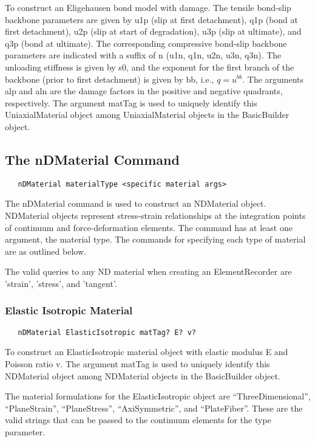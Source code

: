 \documentclass[12pt]{article}
\begin{document}
To construct an Eligehausen bond model with damage. The tensile bond-slip backbone
parameters are given by u1p (slip at first detachment), q1p (bond at first
detachment), u2p (slip at start of degradation), u3p (slip at ultimate), and
q3p (bond at ultimate). The corresponding compressive bond-slip backbone parameters are
indicated with a suffix of n (u1n, q1n, u2n, u3n, q3n).  The unloading stiffness
is given by s0, and the exponent for the first branch of the backbone (prior
to first detachment) is given by bb, i.e., $q = u^{bb}$. The arguments
alp and aln are the damage factors in the positive and negative quadrants,
respectively. The argument 
matTag is used to uniquely identify this UniaxialMaterial object among 
UniaxialMaterial objects in the BasicBuilder object.


\subsection{The nDMaterial Command}
{\sf\small
\begin{verbatim}
   nDMaterial materialType <specific material args>
\end{verbatim}
}

The nDMaterial command is used to construct an NDMaterial object. NDMaterial
objects represent stress-strain relationships at the integration points of
continuum and force-deformation elements. The command has at least one
argument, the material type. The commands for specifying
each type of material are as outlined below.  

The valid queries to any ND material when creating an ElementRecorder
are 'strain', 'stress', and 'tangent'.

\subsubsection{Elastic Isotropic Material}
{\sf\small
\begin{verbatim}
   nDMaterial ElasticIsotropic matTag? E? v?
\end{verbatim}
}

To construct an ElasticIsotropic material object with elastic modulus
E and Poisson ratio v. The argument matTag is used to
uniquely identify this NDMaterial object among NDMaterial objects
in the BasicBuilder object.

The material formulations for the ElasticIsotropic object are ``ThreeDimensional'',
``PlaneStrain'', ``PlaneStress'', ``AxiSymmetric'', and ``PlateFiber''. These are
the valid strings that can be passed to the continuum elements for the type
parameter. 
\end{document}
